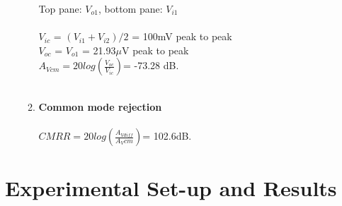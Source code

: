 \documentclass{article}
\begin{document}
\begin{enumerate}
\begin{enumerate}
			Top pane: \(V_{o1}\), bottom pane: \(V_{i1}\)\\\\
			\(V_{ic}\) = \((V_{i1} + V_{i2})/2\) = 100mV peak to peak\\
			\(V_{oc}\) = \(V_{o1}\) = 21.93\(\mu\)V peak to peak\\
			\(A_{Vcm} = 20log(\frac{V_{oc}}{V_{ic}}) \)= -73.28 dB.\\\\
			\item \textbf{Common mode rejection}\\\\
			\(CMRR = 20 log (\frac{A_{Vdiff}}{A_Vcm}) \)= 102.6dB.\\
		\end{enumerate}
	\end{enumerate}
	\section{Experimental Set-up and Results}
\end{document}
